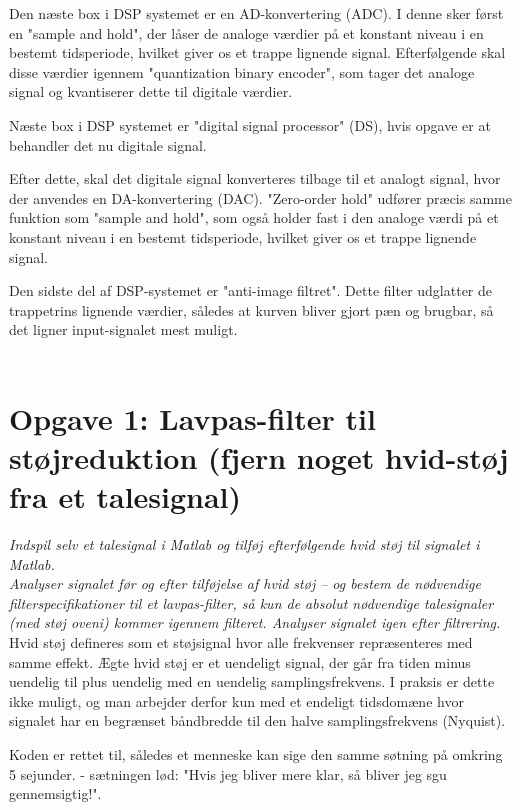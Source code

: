\documentclass[a4paper]{report}
\begin{document}
Den næste box i DSP systemet er en AD-konvertering (ADC). I denne sker først en "sample and hold", der låser de analoge værdier på et konstant niveau i en bestemt tidsperiode, hvilket giver os et trappe lignende signal. Efterfølgende skal disse værdier igennem  "quantization binary encoder", som tager det analoge signal og kvantiserer dette til digitale værdier.

Næste box i DSP systemet er "digital signal processor" (DS), hvis opgave er at behandler det nu digitale signal.

Efter dette, skal det digitale signal konverteres tilbage til et analogt signal, hvor der anvendes en DA-konvertering (DAC). 
"Zero-order hold" udfører præcis samme funktion som "sample and hold", som også holder fast i den analoge værdi på et konstant niveau i en bestemt tidsperiode, hvilket giver os et trappe lignende signal.  

Den sidste del af DSP-systemet er "anti-image filtret". Dette filter udglatter de trappetrins lignende værdier, således at kurven bliver gjort pæn og brugbar, så det ligner input-signalet mest muligt.\\
\\

\section*{Opgave 1: Lavpas-filter til støjreduktion (fjern noget hvid-støj fra et talesignal)}
\textit{Indspil selv et talesignal i Matlab og tilføj efterfølgende hvid støj til signalet i Matlab.\\ 
Analyser signalet før og efter tilføjelse af hvid støj – og bestem de nødvendige filterspecifikationer til et lavpas-filter, så kun de absolut nødvendige talesignaler (med støj oveni) kommer igennem filteret.
Analyser signalet igen efter filtrering.}\\

Hvid støj defineres som et støjsignal hvor alle frekvenser repræsenteres med samme effekt. Ægte hvid støj er et uendeligt signal, der går fra tiden minus uendelig til plus uendelig med en uendelig samplingsfrekvens. I praksis er dette ikke muligt, og man arbejder derfor kun med et endeligt tidsdomæne hvor signalet har en begrænset båndbredde til den halve samplingsfrekvens (Nyquist). 


Koden er rettet til, således et menneske kan sige den samme søtning på omkring 5 sejunder. - sætningen lød: "Hvis jeg bliver mere klar, så bliver jeg sgu gennemsigtig!". 
\end{document}

